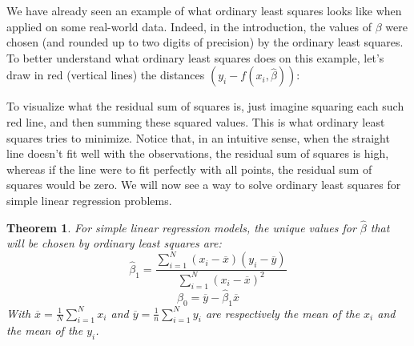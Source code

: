 \documentclass{article}
\newtheorem{theorem}{Theorem}[section]
\theoremstyle{definition}
\theoremstyle{remark}
\theoremstyle{example}
\newcommand{\betat}{\hat{\beta}}
\begin{document}
We have already seen an example of what ordinary least squares looks like when applied on some real-world data. Indeed, in the introduction, the values of $\beta$ were chosen (and rounded up to two digits of precision) by the ordinary least squares. To better understand what ordinary least squares does on this example, let's draw in red (vertical lines) the distances $(y_i - f(x_i, \betat))$:

\begin{figure}[h!]
		\centering
		\scalebox{0.7}{}
\end{figure}

To visualize what the residual sum of squares is, just imagine squaring each such red line, and then summing these squared values. This is what ordinary least squares tries to minimize. Notice that, in an intuitive sense, when the straight line doesn't fit well with the observations, the residual sum of squares is high, whereas if the line were to fit perfectly with all points, the residual sum of squares would be zero. We will now see a way to solve ordinary least squares for simple linear regression problems.

\begin{theorem} %
		For simple linear regression models, the \textit{unique} values for $\betat$ that will be chosen by ordinary least squares are:
				$$\betat_1 = \frac{\sum_{i=1}^N (x_i - \overline{x})(y_i - \overline{y})}{\sum_{i=1}^N (x_i - \overline{x})^2}$$
				$$\betat_0 = \overline{y} - \betat_1 \overline{x}$$
		With $\overline{x} = \frac{1}{N}\sum_{i=1}^N x_i$ and $\overline{y} = \frac{1}{n}\sum_{i=1}^N y_i$ are respectively the mean of the $x_i$ and the mean of the $y_i$.
\end{theorem}
\end{document}
